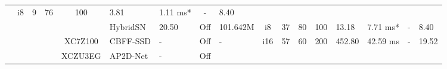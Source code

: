 \documentclass{article}
\begin{document}
\begin{table}
\begin{adjustbox}{totalheight=\baselineskip,}
\begin{tabular}{ccccclp{2em}cp{3em}cp{2em}p{4em}p{3em}p{3.5em}p{3.5em}p{2.5em}p{3em}}
                                   &\multirow{1}{*}{i8}
                                       &\multirow{1}{*}{9}
                                           &\multirow{1}{*}{76}
                                               &\multirow{1}{*}{100}
                                                   &\multirow{1}{*}{3.81}
                                                       &\multirow{1}{*}{1.11 ms*}
                                                           &\multirow{1}{*}{-}
                                                               &\multirow{1}{*}{8.40}\\
   &   &   &   &   &\multirow{1}{*}{HybridSN}
                       &\multirow{1}{*}{20.50}
                           &\multirow{1}{*}{Off}
                               &\multirow{1}{*}{101.642M}
                                   &\multirow{1}{*}{i8}
                                       &\multirow{1}{*}{37}
                                           &\multirow{1}{*}{80}
                                               &\multirow{1}{*}{100}
                                                   &\multirow{1}{*}{13.18}
                                                       &\multirow{1}{*}{7.71 ms*}
                                                           &\multirow{1}{*}{-}
                                                               &\multirow{1}{*}{8.40}\\
\cmidrule{4-17}
   &   &   &\multirow{1}{*}{\cite{liEfficientObjectDetection2019a}}
               &\multirow{1}{*}{XC7Z100}
                   &\multirow{1}{*}{CBFF-SSD}
                       &\multirow{1}{*}{-}
                           &\multirow{1}{*}{Off}
                               &\multirow{1}{*}{-}
                                   &\multirow{1}{*}{i16}
                                       &\multirow{1}{*}{57}
                                           &\multirow{1}{*}{60}
                                               &\multirow{1}{*}{200}
                                                   &\multirow{1}{*}{452.80}
                                                       &\multirow{1}{*}{42.59 ms}
                                                           &\multirow{1}{*}{-}
                                                               &\multirow{1}{*}{19.52}\\
\cmidrule{4-17}
   &   &   &\multirow{1}{*}{\cite{liNovelCNNBasedAP2DNet2020}}
               &\multirow{1}{*}{XCZU3EG}
                   &\multirow{1}{*}{AP2D-Net}
                       &\multirow{1}{*}{-}
                           &\multirow{1}{*}{Off}

\end{tabular}
\end{adjustbox}
\end{table}
\end{document}
